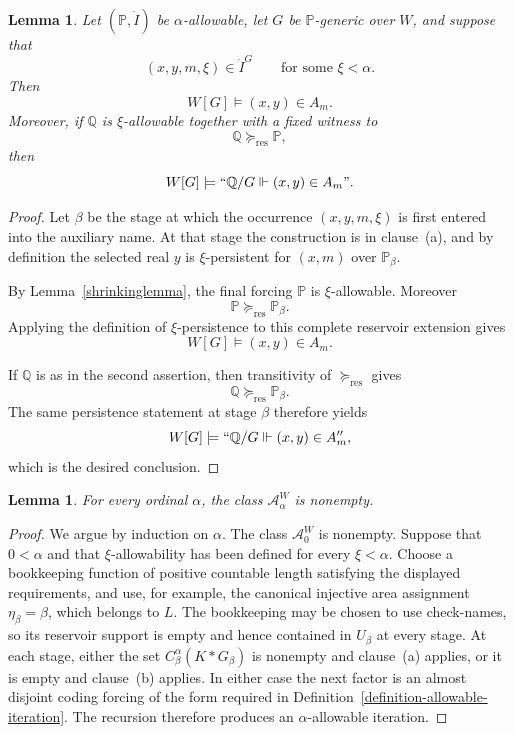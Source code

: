 \documentclass[a4paper,11pt]{article}
\newtheorem{lemma}[theorem]{Lemma}
\newcommand{\forceP}{\mathbb{P}}
\newcommand{\forceQ}{\mathbb{Q}}
\begin{document}
\begin{lemma}
\label{fvaluesremain2}
Let $(\forceP,\dot I)$ be $\alpha$-allowable, let $G$ be $\forceP$-generic over $W$, and suppose that
\[
   (x,y,m,\xi)\in\dot I^G
   \qquad\text{for some }\xi<\alpha.
\]
Then
\[
   W[G]\models(x,y)\in A_m.
\]
Moreover, if $\forceQ$ is $\xi$-allowable together with a fixed witness to
\[
   \forceQ\succeq_{\mathrm{res}}\forceP,
\]
then
\[
   W[G]\models
   ``\forceQ/G\Vdash(x,y)\in A_m".
\]
\end{lemma}

\begin{proof}
Let $\beta$ be the stage at which the occurrence $(x,y,m,\xi)$ is first
entered into the auxiliary name.  At that stage the construction is in
clause~\textup{(a)}, and by definition the selected real $y$ is
$\xi$-persistent for $(x,m)$ over $\forceP_\beta$.

By Lemma~\ref{shrinkinglemma}, the final forcing $\forceP$ is
$\xi$-allowable.  Moreover
\[
   \forceP\succeq_{\mathrm{res}}\forceP_\beta.
\]
Applying the definition of $\xi$-persistence to this complete reservoir
extension gives
\[
   W[G]\models (x,y)\in A_m.
\]

If $\forceQ$ is as in the second assertion, then transitivity of
$\succeq_{\mathrm{res}}$ gives
\[
   \forceQ\succeq_{\mathrm{res}}\forceP_\beta.
\]
The same persistence statement at stage $\beta$ therefore yields
\[
   W[G]\models ``\forceQ/G\Vdash (x,y)\in A_m'',
\]
which is the desired conclusion.
\end{proof}

\begin{lemma}
\label{nonempty-alpha-allowable}
For every ordinal $\alpha$, the class $\mathcal A^W_\alpha$ is nonempty.
\end{lemma}

\begin{proof}
We argue by induction on $\alpha$.  The class $\mathcal A^W_0$ is nonempty.  Suppose that $0<\alpha$ and that $\xi$-allowability has been defined for every $\xi<\alpha$.  Choose a bookkeeping function of positive countable length satisfying the displayed requirements, and use, for example, the canonical injective area assignment $\eta_\beta=\beta$, which belongs to $L$.  The bookkeeping may be chosen to use check-names, so its reservoir support is empty and hence contained in $U_\beta$ at every stage.  At each stage, either the set $C_\beta^\alpha(K*G_\beta)$ is nonempty and clause~\textup{(a)} applies, or it is empty and clause~\textup{(b)} applies.  In either case the next factor is an almost disjoint coding forcing of the form required in Definition~\ref{definition-allowable-iteration}.  The recursion therefore produces an $\alpha$-allowable iteration.
\end{proof}
\end{document}
